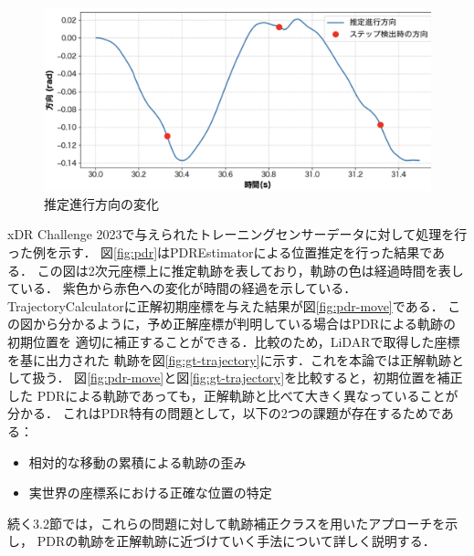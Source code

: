 \begin{figure}[H]
	\centering
	\includegraphics[width=\linewidth]{image/step_timing_angle.jpg}
	\caption{推定進行方向の変化}    \label{fig:step_timing}
\end{figure}


xDR Challenge 2023で与えられたトレーニングセンサーデータに対して処理を行った例を示す．
図\ref{fig:pdr}はPDREstimatorによる位置推定を行った結果である．
この図は2次元座標上に推定軌跡を表しており，軌跡の色は経過時間を表している．
紫色から赤色への変化が時間の経過を示している．
TrajectoryCalculatorに正解初期座標を与えた結果が図\ref{fig:pdr-move}である．
この図から分かるように，予め正解座標が判明している場合はPDRによる軌跡の初期位置を
適切に補正することができる．比較のため，LiDARで取得した座標を基に出力された
軌跡を図\ref{fig:gt-trajectory}に示す．これを本論では正解軌跡として扱う．
図\ref{fig:pdr-move}と図\ref*{fig:gt-trajectory}を比較すると，初期位置を補正した
PDRによる軌跡であっても，正解軌跡と比べて大きく異なっていることが分かる．
これはPDR特有の問題として，以下の2つの課題が存在するためである：

\begin{itemize}
    \item 相対的な移動の累積による軌跡の歪み
    \item 実世界の座標系における正確な位置の特定
\end{itemize}


続く3.2節では，これらの問題に対して軌跡補正クラスを用いたアプローチを示し，
PDRの軌跡を正解軌跡に近づけていく手法について詳しく説明する．


